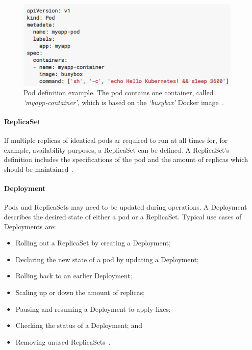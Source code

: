 \begin{figure}
\begin{center}
\includegraphics[width=0.90 \columnwidth]{Images/Pod_example.PNG}
\end{center}
\captionsetup{justification=centering}
\caption{Pod definition example. The pod contains one container, called \textit{`myapp-container'}, which is based on the \textit{`busybox'} Docker image~\citep{Kubernetes-Pod}.}
\label{fig:pod}
\end{figure}

\paragraph{ReplicaSet}
If multiple replicas of identical pods ar required to run at all times for, for example, availability purposes, a ReplicaSet can be defined. A ReplicaSet's definition includes the specifications of the pod and the amount of replicas which should be maintained~\citep{Kubernetes-ReplicaSet}.

\paragraph{Deployment}
Pods and ReplicaSets may need to be updated during operations. A Deployment describes the desired state of either a pod or a ReplicaSet. Typical use cases of Deployments are:
\begin{itemize}
    \item Rolling out a ReplicaSet by creating a Deployment;
    \item Declaring the new state of a pod by updating a Deployment;
    \item Rolling back to an earlier Deployment;
    \item Scaling up or down the amount of replicas;
    \item Pausing and resuming a Deployment to apply fixes;
    \item Checking the status of a Deployment; and
    \item Removing unused ReplicaSets~\citep{Kubernetes-Deployment}.
\end{itemize}

